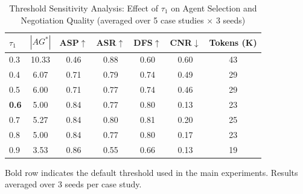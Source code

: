 \begin{table}[t]
\centering
\caption{Threshold Sensitivity Analysis: Effect of $\tau_1$ on Agent Selection and Negotiation Quality (averaged over 5 case studies $\times$ 3 seeds)}
\label{tab:threshold_sensitivity}
\begin{tabular}{l ccccc c}
\toprule
$\tau_1$ & $|AG^*|$ & ASP$\uparrow$ & ASR$\uparrow$ & DFS$\uparrow$ & CNR$\downarrow$ & Tokens (K) \\
\midrule
0.3 & 10.33 & 0.46 & 0.88 & 0.60 & 0.60 & 43 \\
0.4 & 6.07 & 0.71 & 0.79 & 0.74 & 0.49 & 29 \\
0.5 & 6.00 & 0.71 & 0.77 & 0.74 & 0.46 & 29 \\
\textbf{0.6} & 5.00 & 0.84 & 0.77 & 0.80 & 0.13 & 23 \\
0.7 & 5.27 & 0.84 & 0.80 & 0.81 & 0.20 & 25 \\
0.8 & 5.00 & 0.84 & 0.77 & 0.80 & 0.17 & 23 \\
0.9 & 3.53 & 0.86 & 0.55 & 0.66 & 0.13 & 19 \\
\bottomrule
\end{tabular}
\begin{minipage}{\textwidth}
\vspace{4pt}
\footnotesize
Bold row indicates the default threshold used in the main experiments. Results averaged over 3 seeds per case study.
\end{minipage}
\end{table}